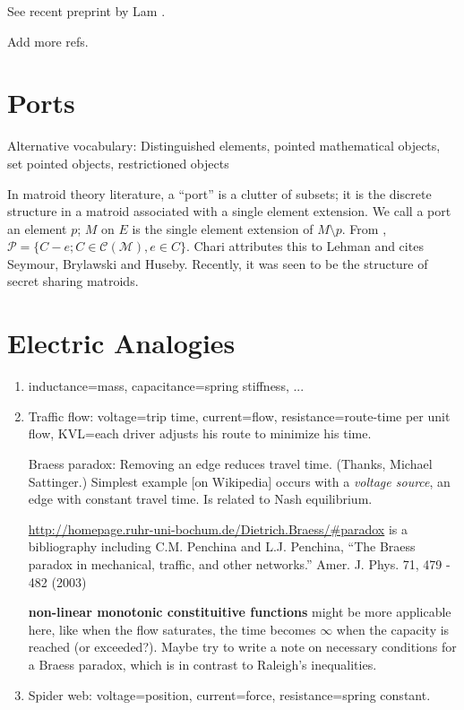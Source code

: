 \documentclass{article}
\begin{document}
See recent preprint by Lam \cite{LamElectroidVar2014}.

Add more refs.



\section{Ports}

Alternative vocabulary: 
Distinguished elements, pointed mathematical objects, set pointed objects, 
restrictioned objects

In matroid theory literature, a ``port'' is a clutter of subsets; it is the 
discrete structure in a matroid associated with a single element extension.
We call a port an element $p$; $M$ on $E$ is the single element extension
of $M\setminus p$.  From \cite{MatroidPortsSteinerShellChari}, 
$\mathcal{P}= \{ C - e; C\in\mathcal{C}(\mathcal{M}), e\in C\}$.
Chari attributes this to Lehman and cites Seymour, Brylawski and Huseby.
Recently, it was seen to be the structure of secret sharing matroids.

\section{Electric Analogies}

\begin{enumerate}
\item inductance=mass, capacitance=spring stiffness, ...
\item Traffic flow: voltage=trip time, current=flow, resistance=route-time 
per unit flow, KVL=each driver adjusts his route to minimize his time.

Braess paradox: Removing an edge reduces travel time. (Thanks, Michael 
Sattinger.)
Simplest example [on Wikipedia] occurs with a \textit{voltage source}, an edge
with constant travel time.  Is related to Nash equilibrium.

\url{http://homepage.ruhr-uni-bochum.de/Dietrich.Braess/#paradox}
is a bibliography including 
C.M. Penchina and L.J. Penchina,
   ``The Braess paradox in mechanical, traffic, and other networks.''
\cite{BraessAJPhy}
   Amer. J. Phys. 71, 479 - 482 (2003)

\textbf{non-linear monotonic constituitive functions} might be more applicable
here, like when the flow saturates, the time becomes $\infty$ when the capacity
is reached (or exceeded?).  Maybe try to write a note on necessary 
conditions for a Braess paradox, which is in contrast to Raleigh's 
inequalities.
 
\item Spider web: voltage=position, current=force, resistance=spring constant.
\end{enumerate}
\end{document}

